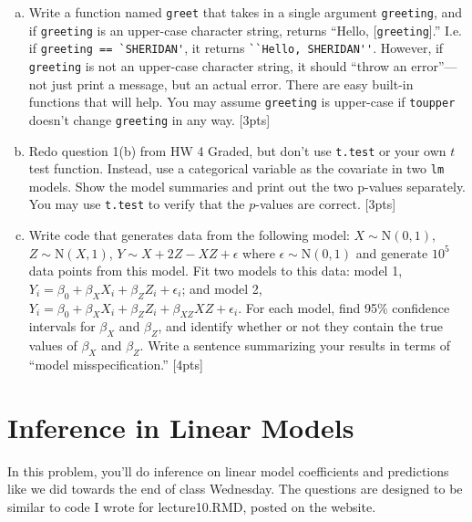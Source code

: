 \documentclass[12pt]{article}
\newcommand{\Norm}{\text{N}}
\begin{document}
\begin{enumerate}[(a)]
	\item Write a function named \verb|greet| that takes in a single argument \verb|greeting|, and if \verb|greeting| is an upper-case character string, returns ``Hello, [\verb|greeting|].'' I.e. if \verb|greeting == `SHERIDAN'|, it returns \verb|``Hello, SHERIDAN''|. However, if \verb|greeting| is not an upper-case character string, it should ``throw an error''---not just print a message, but an actual error. There are easy built-in functions that will help. You may assume \verb|greeting| is upper-case if \verb|toupper| doesn't change \verb|greeting| in any way. [3pts]
	\item Redo question 1(b) from HW 4 Graded, but don't use \verb|t.test| or your own $t$ test function. Instead, use a categorical variable as the covariate in two \verb|lm| models. Show the model summaries and print out the two p-values separately. You may use \verb|t.test| to verify that the $p$-values are correct. [3pts]
	\item Write code that generates data from the following model: $X \sim \Norm(0,1)$, $Z \sim \Norm(X,1)$, $Y \sim X + 2Z - XZ + \epsilon$ where $\epsilon \sim \Norm(0,1)$ and generate $10^5$ data points from this model. Fit two models to this data: model 1, $Y_i = \beta_0 + \beta_X X_i + \beta_Z Z_i + \epsilon_i$; and model 2, $Y_i = \beta_0 + \beta_X X_i + \beta_Z Z_i + \beta_{XZ} XZ + \epsilon_i$. For each model, find 95\% confidence intervals for $\beta_X$ and $\beta_Z$, and identify whether or not they contain the true values of $\beta_X$ and $\beta_Z$. Write a sentence summarizing your results in terms of ``model misspecification.'' [4pts]
\end{enumerate}

\section{Inference in Linear Models}

In this problem, you'll do inference on linear model coefficients and predictions like we did towards the end of class Wednesday. The questions are designed to be similar to code I wrote for lecture10.RMD, posted on the website.
\end{document}
